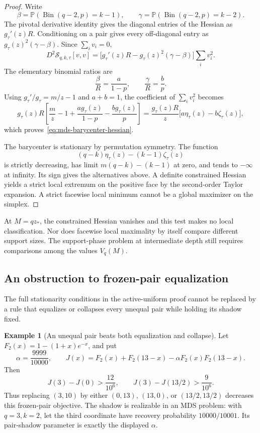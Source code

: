\documentclass[11pt]{article}
\theoremstyle{definition}
\newtheorem{example}{Example}
\theoremstyle{remark}
\DeclareMathOperator{\Bin}{Bin}
\newcommand{\Pbb}{\mathbb P}
\newcommand{\1}{\mathbf 1}
\begin{document}
\begin{proof}
Write
\[
  \beta=\Pbb(\Bin(q-2,p)=k-1),\qquad
  \gamma=\Pbb(\Bin(q-2,p)=k-2).
\]
The pivotal derivative identity gives the diagonal entries of the
Hessian as \(g_\tau'(z)R\).  Conditioning on a pair gives every
off-diagonal entry as \(g_\tau(z)^2(\gamma-\beta)\).
Since \(\sum_i v_i=0\),
\[
  D^2\mathcal S_{q,k,\tau}[v,v]
  =\bigl[g_\tau'(z)R-g_\tau(z)^2(\gamma-\beta)\bigr]
    \sum_i v_i^2.
\]
The elementary binomial ratios are
\[
  \frac\beta R=\frac{a}{1-p},\qquad
  \frac\gamma R=\frac b p.
\]
Using \(g_\tau'/g_\tau=m/z-1\) and \(a+b=1\), the coefficient
of \(\sum_i v_i^2\) becomes
\[
  g_\tau(z)R
  \left[\frac mz-1+\frac{a g_\tau(z)}{1-p}
                    -\frac{b g_\tau(z)}p\right]
  =\frac{g_\tau(z)R}{z}
    \bigl[a\eta_\tau(z)-b\zeta_\tau(z)\bigr],
\]
which proves~\eqref{eq:mds-barycenter-hessian}.

The barycenter is stationary by permutation symmetry.  The function
\[
  (q-k)\eta_\tau(z)-(k-1)\zeta_\tau(z)
\]
is strictly decreasing, has limit
\(m(q-k)-(k-1)\) at zero, and tends to \(-\infty\) at infinity.
Its sign gives the alternatives above.  A definite constrained
Hessian yields a strict local extremum on the positive face by the
second-order Taylor expansion.  A strict facewise local minimum
cannot be a global maximizer on the simplex.
\end{proof}

At \(M=qz_*\), the constrained Hessian vanishes and this test makes
no local classification.  Nor does facewise local maximality by
itself compare different support sizes.  The support-phase problem
at intermediate depth still requires comparisons among the values
\(V_q(M)\).

\subsection{An obstruction to frozen-pair equalization}

The full stationarity conditions in the active-uniform proof cannot
be replaced by a rule that equalizes or collapses every unequal
pair while holding its shadow fixed.

\begin{example}[An unequal pair beats both equalization and collapse]
\label{ex:mds-frozen-pair}
Let \(F_2(x)=1-(1+x)e^{-x}\), and put
\[
  \alpha=\frac{9999}{10000},\qquad
  J(x)=F_2(x)+F_2(13-x)-\alpha F_2(x)F_2(13-x).
\]
Then
\begin{equation}\label{eq:mds-frozen-pair-signs}
  J(3)-J(0)>\frac{12}{10^6},\qquad
  J(3)-J(13/2)>\frac9{10^6}.
\end{equation}
Thus replacing \((3,10)\) by either \((0,13)\), \((13,0)\), or
\((13/2,13/2)\) decreases this frozen-pair objective.  The shadow
is realizable in an MDS problem: with \(q=3,k=2\), let the third
coordinate have recovery probability \(10000/10001\).  Its
pair-shadow parameter is exactly the displayed \(\alpha\).
\end{example}
\end{document}
